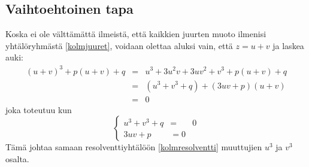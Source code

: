 \documentclass[a4paper]{article}
\begin{document}
\subsection{Vaihtoehtoinen tapa}
Koska ei ole välttämättä ilmeistä, että kaikkien juurten muoto ilmenisi yhtälöryhmästä \ref{kolmjuuret}, voidaan olettaa aluksi vain, että $z=u+v$ ja laskea auki:
\begin{eqnarray*}
  (u+v)^3+p(u+v)+q & = & u^3+3u^2 v+3uv^2+v^3+p(u+v)+q \\
  & = & (u^3+v^3+q) + (3uv+p)(u+v) \\
  & = & 0
\end{eqnarray*}
joka toteutuu kun
$$
\left\{
\begin{array}{ccc}
  u^3+v^3+q & = & 0 \\
  3uv+p & = 0
\end{array}
\right.
$$
Tämä johtaa samaan resolventtiyhtälöön \ref{kolmresolventti} muuttujien $u^3$ ja $v^3$ osalta.
\end{document}
